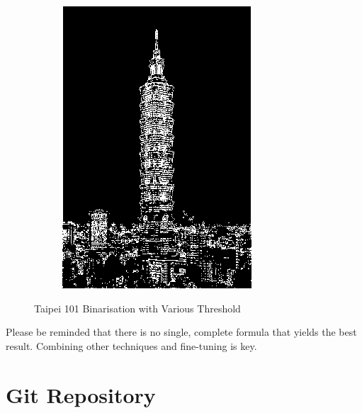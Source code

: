 \documentclass[12pt,a4paper]{report}
\begin{document}
\begin{figure}[!htb]
\begin{subfigure}{0.45\linewidth}
    \includegraphics[width=1\linewidth]{output/taipei101_Q4_t_128.png}
  \end{subfigure}
  \caption{Taipei 101 Binarisation with Various Threshold}
\end{figure}
Please be reminded that there is no single, complete formula that yields the best result. Combining other techniques and fine-tuning is key.






\clearpage


\appendix
\chapter{Git Repository}
\end{document}
